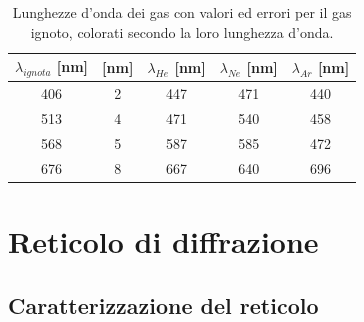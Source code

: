 \documentclass[letterpaper,12pt]{article}
\begin{document}
\begin{table}[h!]
    \centering
    \begin{tabular}{|c|c|c|c|c|}
    \hline
    \textbf{$\lambda_{ignota}$} [nm] & \text{$\pm\sigma_\text{ignoto}$} [nm] & \textbf{$\lambda_{He}$} [nm] & \textbf{$\lambda_{Ne}$} [nm] & \textbf{$\lambda_{Ar}$} [nm]\\
    \hline
    \cellcolor{wavelength_406} 406 & \cellcolor{wavelength_406}2 & \cellcolor{wavelength_447} 447 & \cellcolor{wavelength_471} 471 & \cellcolor{wavelength_440} 440 \\
    \hline
    \cellcolor{wavelength_513} 513 & \cellcolor{wavelength_513}4 & \cellcolor{wavelength_471} 471 & \cellcolor{wavelength_540} 540 & \cellcolor{wavelength_458} 458 \\
    \hline
    \cellcolor{wavelength_568} 568 & \cellcolor{wavelength_568}5 & \cellcolor{wavelength_587} 587 & \cellcolor{wavelength_585} 585 & \cellcolor{wavelength_472} 472 \\
    \hline
    \cellcolor{wavelength_676} 676 & \cellcolor{wavelength_676}8 & \cellcolor{wavelength_667} 667 & \cellcolor{wavelength_640} 640 & \cellcolor{wavelength_696} 696 \\
    \hline
    \end{tabular}
    \caption{Lunghezze d'onda dei gas con valori ed errori per il gas ignoto, colorati secondo la loro lunghezza d'onda.}
    \label{tab:prisma_ignoto}
\end{table}


\section{Reticolo di diffrazione}

\subsection{Caratterizzazione del reticolo}
\end{document}
